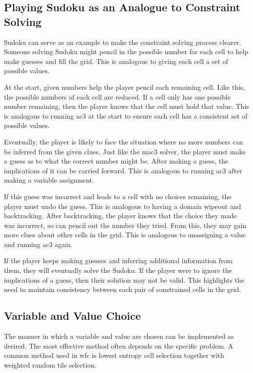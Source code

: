 \subsection{Playing Sudoku as an Analogue to Constraint Solving}
Sudoku can serve as an example to make the constraint solving process clearer. Someone solving Sudoku might pencil in the possible number for each cell to help make guesses and fill the grid. This is analogous to giving each cell a set of possible values.

At the start, given numbers help the player pencil each remaining cell. Like this, the possible numbers of each cell are reduced. If a cell only has one possible number remaining, then the player knows that the cell must hold that value. This is analogous to running \acrshort{ac3} at the start to ensure each cell has a consistent set of possible values.

Eventually, the player is likely to face the situation where no more numbers can be inferred from the given clues. Just like the \acrshort{mac3} solver, the player must make a guess as to what the correct number might be. After making a guess, the implications of it can be carried forward. This is analogous to running \acrshort{ac3} after making a variable assignment.

If this guess was incorrect and leads to a cell with no choices remaining, the player must undo the guess. This is analogous to having a domain wipeout and backtracking. After backtracking, the player knows that the choice they made was incorrect, so can pencil out the number they tried. From this, they may gain more clues about other cells in the grid. This is analogous to unassigning a value and running \acrshort{ac3} again.

If the player keeps making guesses and inferring additional information from them, they will eventually solve the Sudoku. If the player were to ignore the implications of a guess, then their solution may not be valid. This highlights the need to maintain consistency between each pair of constrained cells in the grid.

\subsection{Variable and Value Choice}\label{sec:variableAndValueChoice}
The manner in which a variable and value are chosen can be implemented as desired. The most effective method often depends on the specific problem. A common method used in \acrlong{wfc} is lowest entropy cell selection together with weighted random tile selection.

